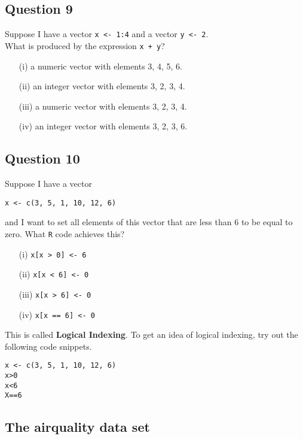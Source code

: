 \documentclass[12pt]{article}
\begin{document}
\subsection*{Question 9}
\Large
Suppose I have a vector \texttt{x <- 1:4} and a vector \texttt{y <- 2}. \\ What is produced by the expression \texttt{x + y}?
\begin{itemize}
	\item[(i)] a numeric vector with elements 3, 4, 5, 6.
	\item[(ii)] an integer vector with elements 3, 2, 3, 4.
	\item[(iii)] a numeric vector with elements 3, 2, 3, 4.
	\item[(iv)] an integer vector with elements 3, 2, 3, 6.
\end{itemize}

\newpage
\subsection*{Question 10}
\Large
Suppose I have a vector 
\begin{verbatim}
x <- c(3, 5, 1, 10, 12, 6) 
\end{verbatim}
and I want to set all elements of this vector that are less than 6 to be equal to zero. What \texttt{R} code achieves this?
\begin{itemize}
\item[(i)] \texttt{x[x > 0] <- 6}
\item[(ii)]\texttt{x[x < 6] <- 0}
\item[(iii)] \texttt{x[x > 6] <- 0}
\item[(iv)] \texttt{x[x == 6] <- 0}
\end{itemize}
\bigskip
\noindent This is called \textbf{Logical Indexing}. To get an idea of logical indexing, try out the following code snippets.
\begin{framed}
\begin{verbatim}
x <- c(3, 5, 1, 10, 12, 6) 
x>0
x<6
X==6
\end{verbatim}
\end{framed}
\newpage
\subsection*{The airquality data set}
\end{document}
